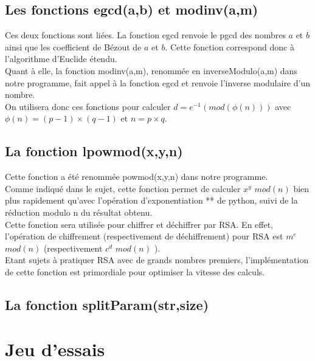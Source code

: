 \documentclass[12pt]{article}
\theoremstyle{definition}
\begin{document}
	\subsection{Les fonctions egcd(a,b) et modinv(a,m)}
	Ces deux fonctions sont liées. La fonction egcd renvoie le pgcd des nombres $a$ et $b$ ainsi que les coefficient de Bézout de $a$ et $b$. Cette fonction correspond donc à l'algorithme d'Euclide étendu.\\
	Quant à elle, la fonction modinv(a,m), renommée en inverseModulo(a,m) dans notre programme, fait appel à la fonction egcd et renvoie l'inverse modulaire d'un nombre.\\
	On utilisera donc ces fonctions pour calculer $d=e^{-1}  (mod(\phi (n)))$ avec $\phi(n) = (p-1) \times (q-1)$ et $n = p \times q$.
	 \subsection{La fonction lpowmod(x,y,n)}
Cette fonction a été renommée powmod(x,y,n) dans notre programme.\\
	 Comme indiqué dans le sujet, cette fonction permet de calculer $x^y$ $mod(n)$ bien plus rapidement qu'avec l'opération d'exponentiation ** de python, suivi de la réduction modulo n du résultat obtenu.\\
	 Cette fonction sera utilisée pour chiffrer et déchiffrer par RSA. En effet, l'opération de chiffrement (respectivement de déchiffrement) pour RSA est $m^e$ $mod(n)$ (respectivement $c^d$ $mod(n)$ ).\\
	 Etant sujets à pratiquer RSA avec de grands nombres premiers, l'implémentation de cette fonction est primordiale pour optimiser la vitesse des calculs.
	 \subsection{La fonction splitParam(str,size)}
	
\vfill \eject
\section{Jeu d'essais}
\end{document}

